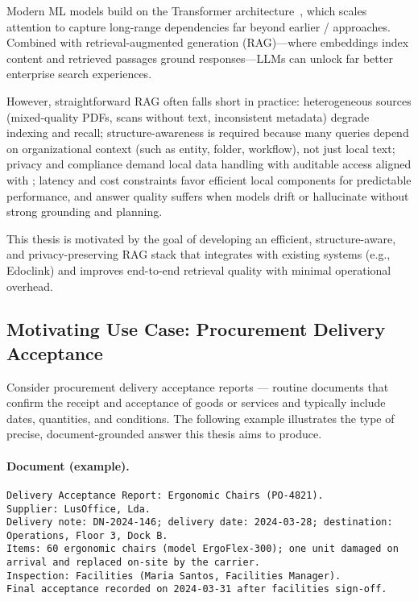 Modern \gls{ML} models build on the Transformer architecture~\cite{vaswani2017attention}, which scales attention to capture long-range dependencies far beyond earlier / approaches. Combined with retrieval-augmented generation (\gls{RAG})—where embeddings index content and retrieved passages ground responses—\glspl{LLM} can unlock far better enterprise search experiences.

However, straightforward \gls{RAG} often falls short in practice: heterogeneous sources (mixed-quality PDFs, scans without text, inconsistent metadata) degrade indexing and recall; structure-awareness is required because many queries depend on organizational context (such as entity, folder, workflow), not just local text; privacy and compliance demand local data handling with auditable access aligned with ; latency and cost constraints favor efficient local components for predictable performance, and answer quality suffers when models drift or hallucinate without strong grounding and planning.

This thesis is motivated by the goal of developing an efficient, structure-aware, and privacy-preserving \gls{RAG} stack that integrates with existing systems (e.g., Edoclink) and improves end-to-end retrieval quality with minimal operational overhead.

\subsection{Motivating Use Case: Procurement Delivery Acceptance}
\label{subsec:motivation-usecase}%
Consider procurement delivery acceptance reports — routine documents that confirm the receipt and acceptance of goods or services and typically include dates, quantities, and conditions. The following example illustrates the type of precise, document-grounded answer this thesis aims to produce.

\paragraph{Document (example).}\mbox{}\par
\begin{lstlisting}[breaklines=true]
Delivery Acceptance Report: Ergonomic Chairs (PO-4821).
Supplier: LusOffice, Lda.
Delivery note: DN-2024-146; delivery date: 2024-03-28; destination: Operations, Floor 3, Dock B.
Items: 60 ergonomic chairs (model ErgoFlex-300); one unit damaged on arrival and replaced on-site by the carrier.
Inspection: Facilities (Maria Santos, Facilities Manager).
Final acceptance recorded on 2024-03-31 after facilities sign-off.
\end{lstlisting}

